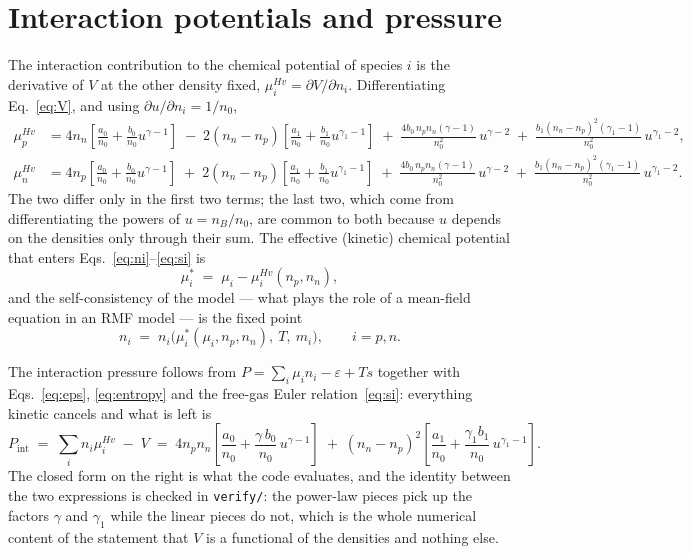 \documentclass[aps,prc,onecolumn,superscriptaddress,nofootinbib,10pt]{revtex4-2}
\newcommand{\nB}{n_B}
\newcommand{\mueff}[1]{\mu^{*}_{#1}}
\newcommand{\muHv}[1]{\mu^{Hv}_{#1}}
\begin{document}
\section{Interaction potentials and pressure}
\label{sec:potentials}

The interaction contribution to the chemical potential of species $i$ is the
derivative of $V$ at the other density fixed,
$\muHv{i} = \partial V / \partial n_i$. Differentiating Eq.~\eqref{eq:V}, and
using $\partial u / \partial n_i = 1/n_0$,
%
\begin{align}
\muHv{p} &= 4 n_n \left[ \frac{a_0}{n_0} + \frac{b_0}{n_0} u^{\gamma-1} \right]
  \;-\; 2 (n_n - n_p) \left[ \frac{a_1}{n_0}
        + \frac{b_1}{n_0} u^{\gamma_1-1} \right]
  \;+\; \frac{4 b_0\, n_p n_n (\gamma - 1)}{n_0^2}\, u^{\gamma-2}
  \;+\; \frac{b_1 (n_n - n_p)^2 (\gamma_1 - 1)}{n_0^2}\, u^{\gamma_1-2} ,
\label{eq:muHvp} \\[2pt]
\muHv{n} &= 4 n_p \left[ \frac{a_0}{n_0} + \frac{b_0}{n_0} u^{\gamma-1} \right]
  \;+\; 2 (n_n - n_p) \left[ \frac{a_1}{n_0}
        + \frac{b_1}{n_0} u^{\gamma_1-1} \right]
  \;+\; \frac{4 b_0\, n_p n_n (\gamma - 1)}{n_0^2}\, u^{\gamma-2}
  \;+\; \frac{b_1 (n_n - n_p)^2 (\gamma_1 - 1)}{n_0^2}\, u^{\gamma_1-2} .
\label{eq:muHvn}
\end{align}
%
The two differ only in the first two terms; the last two, which come from
differentiating the powers of $u = \nB/n_0$, are common to both because $u$
depends on the densities only through their sum. The effective (kinetic)
chemical potential that enters Eqs.~\eqref{eq:ni}--\eqref{eq:si} is
%
\begin{equation}
\mueff{i} \;=\; \mu_i - \muHv{i}(n_p, n_n) ,
\label{eq:mueff}
\end{equation}
%
and the self-consistency of the model --- what plays the role of a mean-field
equation in an RMF model --- is the fixed point
%
\begin{equation}
n_i \;=\; n_i \big( \mueff{i}(\mu_i, n_p, n_n),\ T,\ m_i \big) ,
\qquad i = p, n .
\label{eq:selfconsistency}
\end{equation}

The interaction pressure follows from $P = \sum_i \mu_i n_i - \varepsilon +
Ts$ together with Eqs.~\eqref{eq:eps}, \eqref{eq:entropy} and the free-gas
Euler relation~\eqref{eq:si}: everything kinetic cancels and what is left is
%
\begin{equation}
P_{\mathrm{int}} \;=\; \sum_i n_i \muHv{i} \;-\; V
\;=\; 4 n_p n_n \left[ \frac{a_0}{n_0}
        + \frac{\gamma\, b_0}{n_0}\, u^{\gamma-1} \right]
   \;+\; (n_n - n_p)^2 \left[ \frac{a_1}{n_0}
        + \frac{\gamma_1 b_1}{n_0}\, u^{\gamma_1-1} \right] .
\label{eq:Pint}
\end{equation}
%
The closed form on the right is what the code evaluates, and the identity
between the two expressions is checked in \texttt{verify/}: the power-law
pieces pick up the factors $\gamma$ and $\gamma_1$ while the linear pieces do
not, which is the whole numerical content of the statement that $V$ is a
functional of the densities and nothing else.
\end{document}
